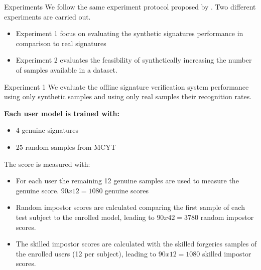 \documentclass{beamer}
\begin{document}
\begin{frame}{Experiments}
We follow the same experiment protocol proposed by \cite{diaz2014generation}. 
Two different experiments are carried out. 

\begin{itemize}
\item Experiment 1 focus on evaluating the synthetic signatures performance in comparison to real signatures
\item Experiment 2 evaluates the feasibility of synthetically increasing the number of samples available in a dataset.
\end{itemize}

\end{frame}


\begin{frame}{Experiment 1}
We evaluate the offline signature verification system performance using only synthetic samples and using only real samples their recognition rates.
\vskip 0.2cm

\textbf{Each user model is trained with:}
\begin{itemize}
\item 4 genuine signatures
\item 25 random samples from MCYT
\end{itemize}

The score is measured with:
\begin{itemize}
\item For each user the remaining 12 genuine samples are used to measure the genuine score. $90 x 12 = 1080$ genuine scores
\item Random impostor scores are calculated comparing the first sample of each test subject to the enrolled model, leading to $90 x 42 = 3780$ random impostor scores.
\item The skilled impostor scores are calculated with the skilled forgeries samples of the enrolled users (12 per subject), leading to $90 x 12 = 1080$ skilled impostor scores.
\end{itemize}

\end{frame}
\end{document}
